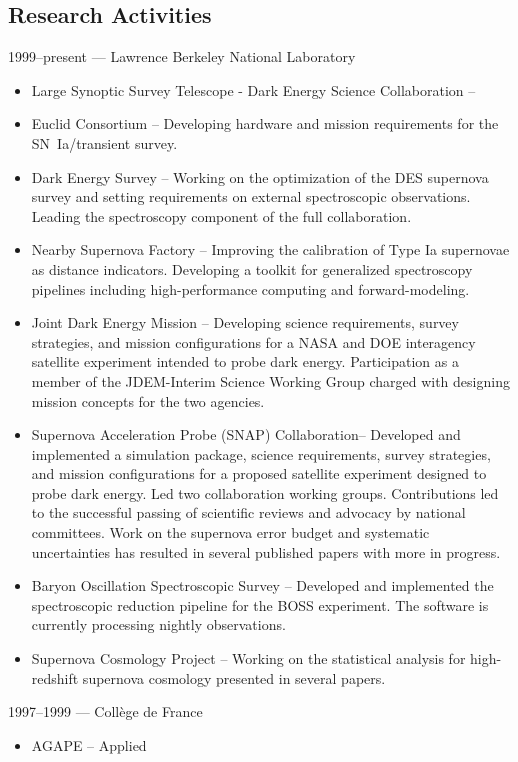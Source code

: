 \documentclass[line, margin]{res}
\begin{document}
\begin{resume}
\section{Research Activities}
1999--present --- Lawrence Berkeley National Laboratory
\begin{itemize}
\item Large Synoptic Survey Telescope - Dark Energy Science Collaboration --
\item Euclid Consortium -- Developing hardware and mission requirements for the SN~Ia/transient survey.
\item Dark Energy Survey -- Working on the optimization of the DES supernova survey and setting requirements
on external spectroscopic observations. Leading the spectroscopy component of the full collaboration.
\item Nearby Supernova Factory -- Improving the calibration of Type Ia supernovae as distance indicators.  Developing
a toolkit for generalized spectroscopy pipelines including high-performance computing and forward-modeling.
\item Joint Dark Energy Mission -- Developing science requirements, survey strategies, and mission configurations for
a NASA and DOE interagency satellite experiment intended to probe dark energy.  Participation as a member of the JDEM-Interim
Science Working Group charged with designing mission concepts for the two agencies.
\item Supernova Acceleration Probe (SNAP) Collaboration-- Developed and implemented a simulation package,
science requirements, survey strategies, and mission configurations for a proposed satellite experiment designed to probe dark energy.
Led two collaboration working groups.  Contributions led to the successful passing of scientific reviews and advocacy by
national committees.  Work on the supernova error budget and systematic uncertainties has resulted in several published papers with
more in progress.
\item Baryon Oscillation Spectroscopic Survey -- Developed and implemented the spectroscopic reduction pipeline for the BOSS experiment.  The software is currently processing nightly observations.
\item Supernova Cosmology Project -- Working on the statistical analysis for high-redshift supernova cosmology presented in
several papers.
\end{itemize}
1997--1999 --- Coll\`ege de France
\begin{itemize}
\item AGAPE -- Applied

\end{itemize}
\end{resume}
\end{document}
